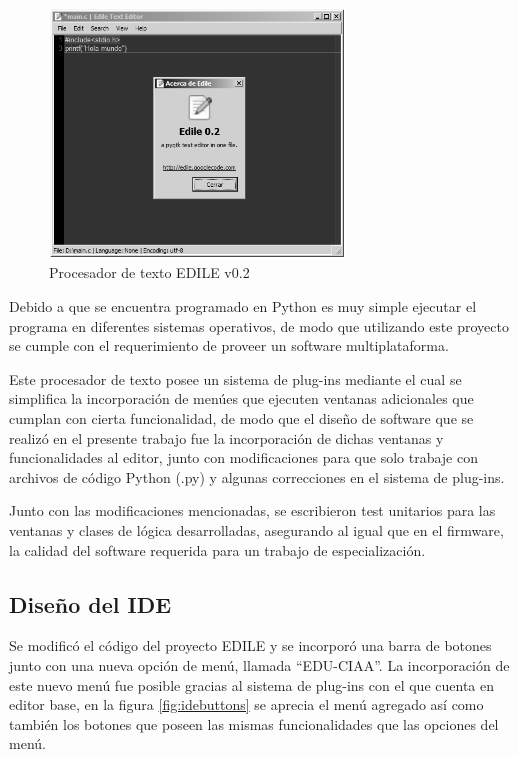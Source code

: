 \begin{figure}[ht]
  \centering
    \includegraphics[width=0.7\textwidth]{Figures/fig_edile}
  \caption{Procesador de texto EDILE v0.2}
  \label{fig:edile}
\end{figure}

Debido a que se encuentra programado en Python es muy simple ejecutar el programa en diferentes sistemas operativos, de modo que utilizando este proyecto se cumple con el requerimiento de proveer un software multiplataforma.

Este procesador de texto posee un sistema de plug-ins mediante el cual se simplifica la incorporación de menúes que ejecuten ventanas adicionales que cumplan con cierta funcionalidad, de modo que el diseño de software que se realizó en el presente trabajo fue la incorporación de dichas ventanas y funcionalidades al editor, junto con modificaciones para que solo trabaje con archivos de código Python (.py) y algunas correcciones en el sistema de plug-ins.

Junto con las modificaciones mencionadas, se escribieron test unitarios para las ventanas y clases de lógica desarrolladas, asegurando al igual que en el firmware, la calidad del software requerida para un trabajo de especialización.

\subsection{Diseño del IDE} 

Se modificó el código del proyecto EDILE y se incorporó una barra de botones junto con una nueva opción de menú, llamada “EDU-CIAA”. La incorporación de este nuevo menú fue posible gracias al sistema de plug-ins con el que cuenta en editor base, en la figura \ref{fig:idebuttons} se aprecia el menú agregado así como también los botones que poseen las mismas funcionalidades que las opciones del menú.


